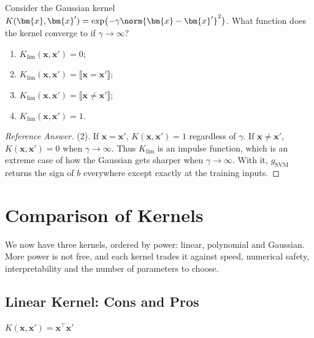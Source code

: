 \begin{exercise}
    Consider the Gaussian kernel \(K(\bm{x}, \bm{x}') = \exp\bigl(-\gamma
    \norm{\bm{x} - \bm{x}'}^2\bigr)\). What function does the kernel converge to
    if \(\gamma \to \infty\)?
    \begin{enumerate}[(1)]
        \item \(K_{\lim}(\bm{x}, \bm{x}') = 0\);
        \item \(K_{\lim}(\bm{x}, \bm{x}') = \llbracket \bm{x} = \bm{x}'
            \rrbracket\);
        \item \(K_{\lim}(\bm{x}, \bm{x}') = \llbracket \bm{x} \neq \bm{x}'
            \rrbracket\);
        \item \(K_{\lim}(\bm{x}, \bm{x}') = 1\).
    \end{enumerate}
\end{exercise}

\begin{proof}[Reference Answer]
    (2). If \(\bm{x} = \bm{x}'\), \(K(\bm{x}, \bm{x}') = 1\) regardless of
    \(\gamma\). If \(\bm{x} \neq \bm{x}'\), \(K(\bm{x}, \bm{x}') = 0\) when
    \(\gamma \to \infty\). Thus \(K_{\lim}\) is an impulse function, which is
    an extreme case of how the Gaussian gets sharper when \(\gamma \to
    \infty\). With it, \(g_{\mathrm{SVM}}\) returns the sign of \(b\)
    everywhere except exactly at the training inputs.
\end{proof}

\section{Comparison of Kernels}\label{sec:kernel-comparison}


We now have three kernels, ordered by power: linear, polynomial and
Gaussian. More power is not free, and each kernel trades it against speed,
numerical safety, interpretability and the number of parameters to choose.

\subsection{Linear Kernel: Cons and Pros}

\begin{center}
    \begin{minipage}[c]{0.4\textwidth}
        \centering
    \end{minipage}%
    \hfill
    \begin{minipage}[c]{0.5\textwidth}
        \centering
        \(K(\bm{x}, \bm{x}') = \bm{x}^\top \bm{x}'\)
    \end{minipage}
\end{center}

